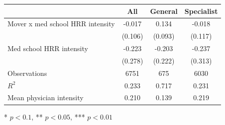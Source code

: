 \begin{table}[t]
\fontsize{12.0pt}{14.0pt}\selectfont
\begin{tabular*}{\linewidth}{@{\extracolsep{\fill}}lccc}
\toprule
  & All & General & Specialist \\ 
\midrule\addlinespace[2.5pt]
Mover x med school HRR intensity & -0.017 & 0.134 & -0.018 \\ 
 & (0.106) & (0.093) & (0.117) \\ 
Med school HRR intensity & -0.223 & -0.203 & -0.237 \\ 
{} & {(0.278)} & {(0.222)} & {(0.313)} \\ 
\midrule
Observations & 6751 & 675 & 6030 \\ 
$R^2$ & 0.233 & 0.717 & 0.231 \\ 
Mean physician intensity & 0.210 & 0.139 & 0.219 \\ 
\bottomrule
\end{tabular*}
\begin{minipage}{\linewidth}
* $p < 0.1$, ** $p < 0.05$, *** $p < 0.01$\\
\end{minipage}
\end{table}

